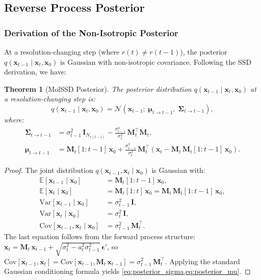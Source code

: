 \documentclass[12pt,a4paper]{article}
\newtheorem{theorem}{Theorem}[section]
\providecommand{\E}{}
\renewcommand{\E}{\mathbb{E}}
\newcommand{\Var}{\mathrm{Var}}
\newcommand{\bx}{\bm{x}}
\newcommand{\bep}{\bm{\epsilon}}
\newcommand{\bmu}{\bm{\mu}}
\newcommand{\bSigma}{\bm{\Sigma}}
\newcommand{\cN}{\mathcal{N}}
\newcommand{\Mt}{\bm{M}_t}
\begin{document}
\subsection{Reverse Process Posterior}\label{sec:posterior}

\subsubsection{Derivation of the Non-Isotropic Posterior}

At a resolution-changing step (where $r(t) \neq r(t-1)$), the posterior $q(\bx_{t-1} \mid \bx_t, \bx_0)$ is Gaussian with non-isotropic covariance. Following the SSD derivation, we have:

\begin{theorem}[MolSSD Posterior]\label{thm:posterior}
The posterior distribution $q(\bx_{t-1} \mid \bx_t, \bx_0)$ at a resolution-changing step is:
\begin{equation}\label{eq:posterior}
    q(\bx_{t-1} \mid \bx_t, \bx_0) = \cN(\bx_{t-1};\; \bmu_{t \to t-1},\; \bSigma_{t \to t-1}),
\end{equation}
where:
\begin{align}
    \bSigma_{t \to t-1} &= \sigma_{t-1}^2\, \bm{I}_{N_{r(t-1)}} - \frac{\sigma_{t-1}^4}{\sigma_t^2}\, \Mt^\top \Mt, \label{eq:posterior_sigma} \\
    \bmu_{t \to t-1} &= \Mt[1:t-1]\, \bx_0 + \frac{\sigma_{t-1}^2}{\sigma_t^2}\, \Mt^\top \left(\bx_t - \Mt\, \Mt[1:t-1]\, \bx_0\right). \label{eq:posterior_mu}
\end{align}
\end{theorem}

\begin{proof}
The joint distribution $q(\bx_{t-1}, \bx_t \mid \bx_0)$ is Gaussian with:
\begin{align}
    \E[\bx_{t-1} \mid \bx_0] &= \Mt[1:t-1]\, \bx_0, \\
    \E[\bx_t \mid \bx_0] &= \Mt[1:t]\, \bx_0 = \Mt\, \Mt[1:t-1]\, \bx_0, \\
    \Var[\bx_{t-1} \mid \bx_0] &= \sigma_{t-1}^2\, \bm{I}, \\
    \Var[\bx_t \mid \bx_0] &= \sigma_t^2\, \bm{I}, \\
    \mathrm{Cov}[\bx_{t-1}, \bx_t \mid \bx_0] &= \sigma_{t-1}^2\, \Mt^\top.
\end{align}
The last equation follows from the forward process structure: $\bx_t = \Mt\, \bx_{t-1} + \sqrt{\sigma_t^2 - a_t^2 \sigma_{t-1}^2}\, \bep'$, so $\mathrm{Cov}[\bx_{t-1}, \bx_t] = \mathrm{Cov}[\bx_{t-1}, \Mt\, \bx_{t-1}] = \sigma_{t-1}^2\, \Mt^\top$. Applying the standard Gaussian conditioning formula yields \cref{eq:posterior_sigma,eq:posterior_mu}.
\end{proof}
\end{document}
